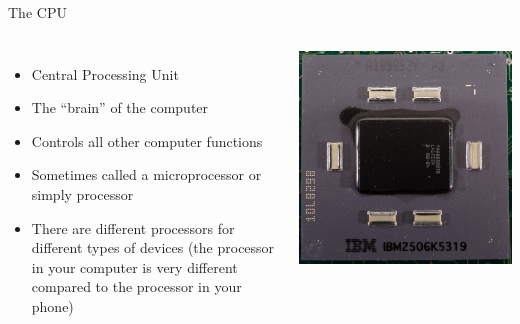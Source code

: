 \documentclass[graphics]{beamer}
\begin{document}
\begin{frame}{The CPU}
\begin{columns}
    \begin{itemize}
        \item Central Processing Unit
        \item The ``brain'' of the computer
        \item Controls all other computer functions
        \item Sometimes called a microprocessor or simply processor
        \item There are different processors for different types of devices (the processor in your computer is very different compared to the processor in your phone)
    \end{itemize}
    \includegraphics[scale=0.6]{L02_ArchNumbersSystems/L2_p8_cpu.png}
    \end{columns}
\end{frame}
\end{document}
